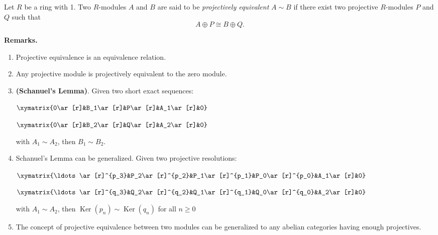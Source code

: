 \documentclass[12pt]{article}
\begin{document}
Let $R$ be a ring with 1.  Two $R$-modules $A$ and $B$ are said to be \emph{projectively equivalent} $A\sim B$ if there exist 
two projective $R$-modules $P$ and $Q$ such that $$A\oplus P\cong B\oplus Q.$$
\par
\textbf{Remarks.} 
\begin{enumerate}
\item Projective equivalence is an equivalence relation.
\item Any projective module is projectively equivalent to the zero module.
\item \textbf{(Schanuel's Lemma)}.  Given two short exact sequences:
\begin{center}
$\xymatrix{0\ar[r]&B_1\ar[r]&P\ar[r]&A_1\ar[r]&0}$
\end{center}
\begin{center}
$\xymatrix{0\ar[r]&B_2\ar[r]&Q\ar[r]&A_2\ar[r]&0}$
\end{center}
with $A_1\sim A_2$, then $B_1\sim B_2$.
\item Schanuel's Lemma can be generalized.  Given two projective resolutions:
\begin{center}
$\xymatrix{\ldots\ar[r]^{p_3}&P_2\ar[r]^{p_2}&P_1\ar[r]^{p_1}&P_0\ar[r]^{p_0}&A_1\ar[r]&0}$
\end{center}
\begin{center}
$\xymatrix{\ldots\ar[r]^{q_3}&Q_2\ar[r]^{q_2}&Q_1\ar[r]^{q_1}&Q_0\ar[r]^{q_0}&A_2\ar[r]&0}$
\end{center}
with $A_1\sim A_2$, then $\operatorname{Ker}(p_n)\sim\operatorname{Ker}(q_n)$ for all $n\geq0$
\item The concept of projective equivalence between two modules can be generalized to any abelian categories having enough projectives.
\end{enumerate}
\end{document}
